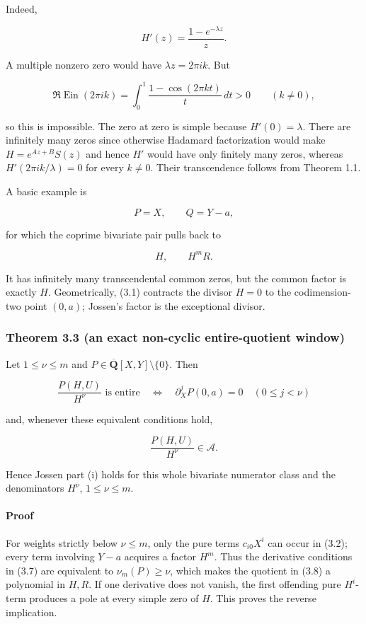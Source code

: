 \documentclass[11pt]{article}
\theoremstyle{keio}
\theoremstyle{definition}
\theoremstyle{remark}
\begin{document}
Indeed,

\[
 H'(z)=\frac{1-e^{-\lambda z}}z.
\]

A multiple nonzero zero would have \(\lambda z=2\pi ik\). But

\[
 \Re\operatorname{Ein}(2\pi ik)
 =\int_0^1\frac{1-\cos(2\pi kt)}t\,dt>0\qquad(k\ne0),         \tag{J-3.6}
\]

so this is impossible. The zero at zero is simple because \(H'(0)=\lambda\).
There are infinitely many zeros since otherwise Hadamard factorization would
make \(H=e^{Az+B}S(z)\) and hence \(H'\) would have only finitely many zeros,
whereas \(H'(2\pi ik/\lambda)=0\) for every \(k\ne0\). Their transcendence
follows from Theorem 1.1.

A basic example is

\[
  P=X,\qquad Q=Y-a,
\]

for which the coprime bivariate pair pulls back to

\[
  H,\qquad H^mR.
\]

It has infinitely many transcendental common zeros, but the common factor is
exactly \(H\). Geometrically, (3.1) contracts the divisor \(H=0\) to the
codimension-two point \((0,a)\); Jossen's factor is the exceptional divisor.

\subsubsection{Theorem 3.3 (an exact non-cyclic entire-quotient window)}

Let \(1\le\nu\le m\) and \(P\in\overline{\mathbf Q}[X,Y]\setminus\{0\}\).
Then

\[
 \frac{P(H,U)}{H^\nu}\text{ is entire}
 \quad\Longleftrightarrow\quad
 \partial_X^jP(0,a)=0\quad(0\le j<\nu)                     \tag{J-3.7}
\]

and, whenever these equivalent conditions hold,

\[
  \frac{P(H,U)}{H^\nu}\in\mathscr A.                        \tag{J-3.8}
\]

Hence Jossen part (i) holds for this whole bivariate numerator class and the
denominators \(H^\nu\), \(1\le\nu\le m\).

\paragraph{Proof}

For weights strictly below \(\nu\le m\), only the pure terms \(c_{i0}X^i\)
can occur in (3.2); every term involving \(Y-a\) acquires a factor \(H^m\).
Thus the derivative conditions in (3.7) are equivalent to
\(\nu_m(P)\ge\nu\), which makes the quotient in (3.8) a polynomial in
\(H,R\). If one derivative does not vanish, the first offending pure
\(H^i\)-term produces a pole at every simple zero of \(H\). This proves the
reverse implication.
\end{document}
